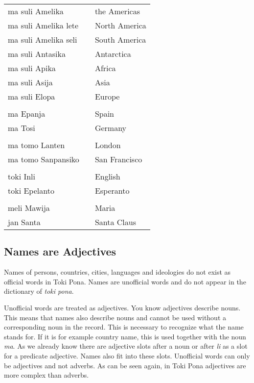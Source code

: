 \begin{supertabular}{p{2,5cm}|ll}
ma suli Amelika && the Americas \\
ma suli Amelika lete && North America \\
ma suli Amelika seli && South America \\
ma suli Antasika && Antarctica \\
ma suli Apika && Africa \\
ma suli Asija && Asia \\
ma suli Elopa && Europe \\
 && \\ %
ma Epanja && Spain \\
ma Tosi && Germany \\
 && \\ %
ma tomo Lanten && London \\ 
ma tomo Sanpansiko && San Francisco \\
 && \\ %
toki Inli  && English \\
toki Epelanto && Esperanto \\
 && \\ %
meli Mawija && Maria \\
jan Santa && Santa Claus \\
\end{supertabular}
%
%
\newpage
{}
\subsection*{Names are Adjectives}
%
Names of persons, countries, cities, languages and ideologies do not exist as official words in Toki Pona. 
Names are unofficial words and do not appear in the dictionary of \textit{toki pona}.

Unofficial words are treated as adjectives.
You know adjectives describe nouns. 
This means that names also describe nouns and cannot be used without a corresponding noun in the record.
This is necessary to recognize what the name stands for. 
If it is for example country name, this is used together with the noun \textit{ma}. 
As we already know there are adjective slots after a noun or after \textit{li} as a slot for a predicate adjective. 
Names also fit into these slots.
Unofficial words can only be adjectives and not adverbs. 
As can be seen again, in Toki Pona adjectives are more complex than adverbs. 

